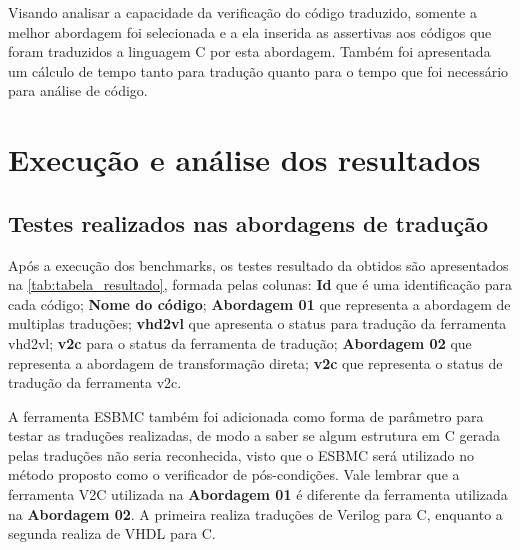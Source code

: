 \par 
Visando analisar a capacidade da verificação do código traduzido, somente a melhor abordagem foi selecionada e a ela inserida as assertivas aos códigos que foram traduzidos a linguagem C por esta abordagem. Também foi apresentada um cálculo de tempo tanto para tradução quanto para o tempo que foi necessário para análise de código. 


\section{Execução e análise dos resultados}


\subsection{Testes realizados nas abordagens de tradução}

Após a execução dos benchmarks, os testes resultado da obtidos são apresentados na \autoref{tab:tabela_resultado}, formada pelas colunas: \textbf{Id} que é uma identificação para cada código; \textbf{Nome do código}; \textbf{Abordagem 01} que representa a abordagem de multiplas traduções; \textbf{vhd2vl} que apresenta o status para tradução da ferramenta vhd2vl; \textbf{v2c} para o status da ferramenta de tradução; \textbf{Abordagem 02} que representa a abordagem de transformação direta; \textbf{v2c} que representa o status de tradução da ferramenta v2c.

\par
A ferramenta ESBMC também foi adicionada como forma de parâmetro para testar as traduções realizadas, de modo a saber se algum estrutura em C gerada pelas traduções não seria reconhecida, visto que o ESBMC será utilizado no método proposto como o verificador de pós-condições. Vale lembrar que a ferramenta V2C utilizada na \textbf{Abordagem 01} é diferente da ferramenta utilizada na \textbf{Abordagem 02}. A primeira realiza traduções de Verilog para C, enquanto a segunda realiza de VHDL para C. 

